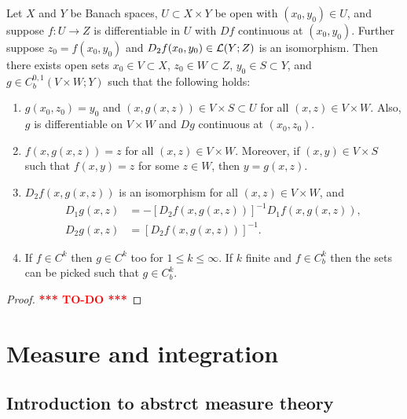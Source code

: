 \documentclass[a4paper]{article}
\newcommand{\TODO}{\textcolor{red}{\textbf{*** TO-DO ***}}}
\begin{document}
\begin{thm}
  Let $X$ and $Y$ be Banach spaces, $U \subset X \times Y$
  be open with $(x_0, y_0) \in U$, and suppose $f: U \to Z$
  is differentiable in $U$ with $Df$ continuous 
  at $(x_0, y_0)$. Further suppose $z_0 = f(x_0, y_0)$
  and $D_2 f(x_0, y_0) \in \mathcal{L}(Y; Z)$ is an isomorphism. 
  Then there exists open sets $x_0 \in V \subset X$, 
  $z_0 \in W \subset Z$, $y_0 \in S \subset Y$, and 
  $g \in C^{0,1}_b (V \times W ; Y)$ such that the following 
  holds:
  \begin{enumerate}
    \item $g(x_0, z_0) = y_0$ and $(x, g(x, z)) \in V \times S 
    \subset U$ for all $(x, z) \in V \times W$. Also, $g$ 
    is differentiable on $V \times W$ and $Dg$ continuous at 
    $(x_0, z_0)$.

    \item $f(x, g(x, z)) = z$ for all $(x, z) \in V \times W$.
    Moreover, if $(x, y) \in V \times S$ such that 
    $f(x, y) = z$ for some $z \in W$, then $y = g(x, z)$.

    \item $D_2 f(x, g(x, z))$ is an isomorphism for all 
    $(x, z) \in V \times W$, and 
    \[
    \begin{aligned}
      D_1 g(x, z) &= - \left[ D_2 f(x, g(x, z)) \right]^{-1} 
      D_1 f (x, g(x, z)), \\
      D_2 g(x, z) &= \left[ D_2 f(x, g(x, z)) \right]^{-1}.
    \end{aligned}
    \]

    \item If $f \in C^k$ then $g \in C^k$ too for $1 \leq k 
    \leq \infty$. If $k$ finite and $f \in C^k_b$ then the 
    sets can be picked such that $g \in C^k_b$.
  \end{enumerate}
\end{thm}

\begin{proof}
  \TODO
\end{proof}


\section{Measure and integration}

\subsection{Introduction to abstrct measure theory}
\end{document}
